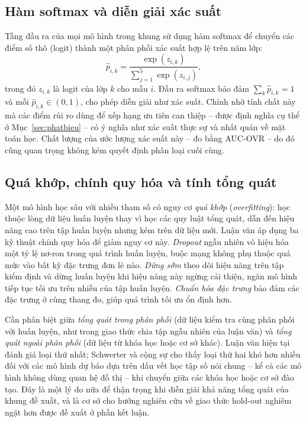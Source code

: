 \subsection{Hàm softmax và diễn giải xác suất}

Tầng đầu ra của mọi mô hình trong khung sử dụng hàm softmax để chuyển các điểm số thô (logit) thành một phân phối xác suất hợp lệ trên năm lớp:
\begin{equation}
\hat{p}_{i,k} = \frac{\exp(z_{i,k})}{\sum_{j=1}^{5} \exp(z_{i,j})},
\end{equation}
trong đó $z_{i,k}$ là logit của lớp $k$ cho mẫu $i$. Đầu ra softmax bảo đảm $\sum_k \hat{p}_{i,k} = 1$ và mỗi $\hat{p}_{i,k} \in (0,1)$, cho phép diễn giải như xác suất. Chính nhờ tính chất này mà các điểm rủi ro dùng để xếp hạng ưu tiên can thiệp -- được định nghĩa cụ thể ở Mục~\ref{sec:phatbieu} -- có ý nghĩa như xác suất thực sự và nhất quán về mặt toán học. Chất lượng của ước lượng xác suất này -- đo bằng AUC-OVR -- do đó cũng quan trọng không kém quyết định phân loại cuối cùng.

\subsection{Quá khớp, chính quy hóa và tính tổng quát}

Một mô hình học sâu với nhiều tham số có nguy cơ \emph{quá khớp} (\textit{overfitting}): học thuộc lòng dữ liệu huấn luyện thay vì học các quy luật tổng quát, dẫn đến hiệu năng cao trên tập huấn luyện nhưng kém trên dữ liệu mới. Luận văn áp dụng ba kỹ thuật chính quy hóa để giảm nguy cơ này. \textit{Dropout} ngẫu nhiên vô hiệu hóa một tỷ lệ nơ-ron trong quá trình huấn luyện, buộc mạng không phụ thuộc quá mức vào bất kỳ đặc trưng đơn lẻ nào. \textit{Dừng sớm} theo dõi hiệu năng trên tập kiểm định và dừng huấn luyện khi hiệu năng này ngừng cải thiện, ngăn mô hình tiếp tục tối ưu trên nhiễu của tập huấn luyện. \textit{Chuẩn hóa đặc trưng} bảo đảm các đặc trưng ở cùng thang đo, giúp quá trình tối ưu ổn định hơn.

Cần phân biệt giữa \emph{tổng quát trong phân phối} (dữ liệu kiểm tra cùng phân phối với huấn luyện, như trong giao thức chia tập ngẫu nhiên của luận văn) và \emph{tổng quát ngoài phân phối} (dữ liệu từ khóa học hoặc cơ sở khác). Luận văn hiện tại đánh giá loại thứ nhất; Schwerter và cộng sự \cite{Schwerter2026} cho thấy loại thứ hai khó hơn nhiều đối với các mô hình dự báo dựa trên dấu vết học tập số nói chung -- kể cả các mô hình không dùng quan hệ đồ thị -- khi chuyển giữa các khóa học hoặc cơ sở đào tạo. Đây là một lý do nữa để thận trọng khi diễn giải khả năng tổng quát của khung đề xuất, và là cơ sở cho hướng nghiên cứu về giao thức hold-out nghiêm ngặt hơn được đề xuất ở phần kết luận.

